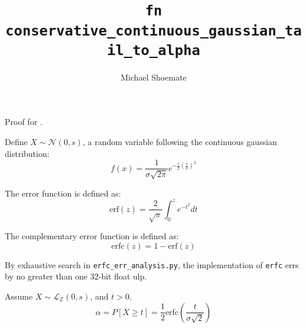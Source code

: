 \documentclass{article}
\title{\texttt{fn conservative\_continuous\_gaussian\_tail\_to\_alpha}}
\author{Michael Shoemate}
\begin{document}
\maketitle

\contrib

Proof for .

\begin{definition}
    \label{gaussian}
    Define $X \sim \mathcal{N}(0, s)$, a random variable following the continuous gaussian distribution:
    \begin{equation}
        f(x) = \frac{1}{\sigma \sqrt{2 \pi}} e^{-\frac{1}{2}\left( \frac{x}{\sigma}\right)^2}
    \end{equation}
\end{definition}

\begin{definition}
    \label{erf}
    The error function is defined as:
    \begin{equation}
        \mathrm{erf}(z) = \frac{2}{\sqrt{\pi}} \int_{0}^{z} e^{-t^2} dt
    \end{equation}
\end{definition}

\begin{definition}
    \label{erfc}
    The complementary error function is defined as:
    \begin{equation}
        \mathrm{erfc}(z) = 1 - \mathrm{erf}(z)
    \end{equation}
\end{definition}

\begin{lemma}
    \label{erfc-err}
    By exhaustive search in \texttt{erfc\_err\_analysis.py}, the implementation of \texttt{erfc} errs by no greater than one 32-bit float ulp.
\end{lemma}

\begin{theorem}
    Assume $X \sim \mathcal{L}_\mathbb{Z}(0, s)$, and $t > 0$.
    \begin{equation}
        \alpha = P[X \ge t] = \frac{1}{2} \mathrm{erfc}\left(\frac{t}{\sigma \sqrt{2}}\right)
    \end{equation}
\end{theorem}
\end{document}
